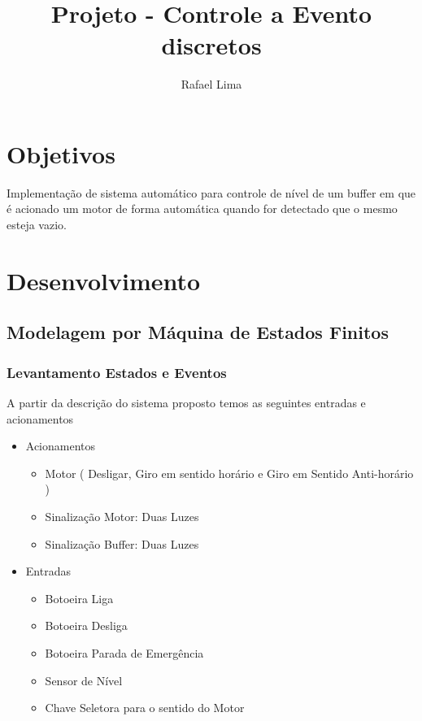 \documentclass[a4paper,11pt]{article}
\title{Projeto - Controle a Evento discretos} %
\author{Rafael Lima}
\begin{document}

\section{Objetivos}

Implementação de sistema automático para controle de nível de um buffer em que é acionado um motor de forma automática quando for detectado que o mesmo esteja vazio.

\section{Desenvolvimento}

\subsection{Modelagem por Máquina de Estados Finitos}

\subsubsection{Levantamento Estados e Eventos}

A partir da descrição do sistema proposto temos as seguintes entradas e acionamentos

\begin{itemize}
    \item Acionamentos
    \begin{itemize}
        \item Motor ( Desligar, Giro em sentido horário e Giro em Sentido Anti-horário )
        \item Sinalização Motor: Duas Luzes
        \item Sinalização Buffer: Duas Luzes
    \end{itemize}
    \item Entradas
    \begin{itemize}
        \item Botoeira Liga
        \item Botoeira Desliga
        \item Botoeira Parada de Emergência
        \item Sensor de Nível
        \item Chave Seletora para o sentido do Motor
    \end{itemize}
\end{itemize}
\end{document}
